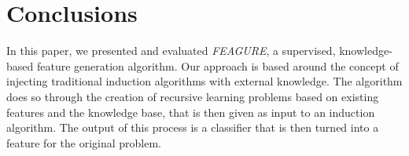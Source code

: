 \documentclass{article}
\theoremstyle{definition}
\begin{document}



\section{Conclusions}

In this paper, we presented and evaluated \emph{FEAGURE}, a supervised, knowledge-based feature generation algorithm. Our approach is based around the concept of injecting traditional induction algorithms with external knowledge. %
The algorithm does so through the creation of recursive learning problems based on existing features and the knowledge base, that is then given as input to an induction algorithm. The output of this process is a classifier that is then turned into a feature for the original problem.


\end{document}
